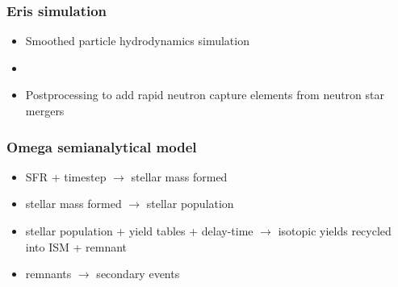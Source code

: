 \begin{frame}
  \frametitle{Eris simulation}
  \begin{minipage}{0.45\linewidth}
  \end{minipage}
  \hfill
  \begin{minipage}{0.45\linewidth}
    \begin{itemize}
    \item Smoothed particle hydrodynamics simulation 
    \item {}
    \item Postprocessing to add rapid neutron capture elements from neutron star mergers 
    \end{itemize}
  \end{minipage}
\end{frame}

\begin{frame}
  \frametitle{Omega semianalytical model }
  \begin{itemize}
  \item SFR + timestep $\rightarrow$ stellar mass formed
  \item stellar mass formed $\rightarrow$ stellar population
  \item stellar population + yield tables + delay-time $\rightarrow$ isotopic yields recycled into ISM + remnant
  \item remnants $\rightarrow$ secondary events
  \end{itemize}
\end{frame}

\begin{frame}
  \makeatletter
  \@title
  \makeatsymbol
\end{frame}
